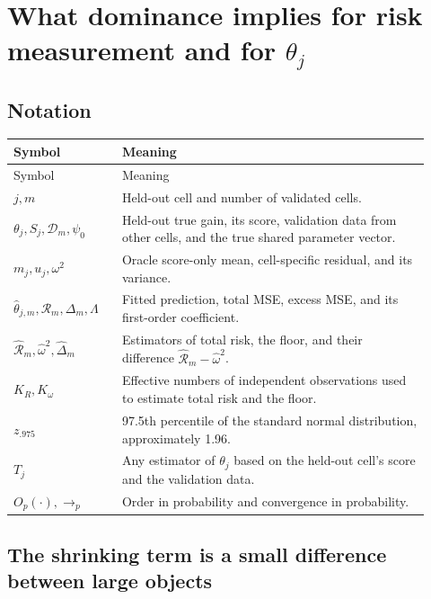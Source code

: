 \documentclass[11pt]{article}
\begin{document}
\section{What dominance implies for risk measurement and for
\texorpdfstring{\(\theta_j\)}{theta j}}

\subsection*{Notation}

\begin{longtable}{>{\raggedright\arraybackslash}p{0.24\linewidth}
                  >{\raggedright\arraybackslash}p{0.68\linewidth}}
\hline
Symbol & Meaning \\
\hline
\endfirsthead
\hline
Symbol & Meaning \\
\hline
\endhead
\(j,m\) & Held-out cell and number of validated cells. \\
\(\theta_j,S_j,\mathcal D_m,\psi_0\) & Held-out true gain, its score,
validation data from other cells, and the true shared parameter vector. \\
\(m_j,u_j,\omega^2\) & Oracle score-only mean, cell-specific residual, and
its variance. \\
\(\widehat\theta_{j,m},\mathcal R_m,\Delta_m,\Lambda\) & Fitted prediction,
total MSE, excess MSE, and its first-order coefficient. \\
\(\widehat{\mathcal R}_m,\widehat\omega^2,
\widehat\Delta_m\) & Estimators of total risk, the floor, and their
difference \(\widehat{\mathcal R}_m-\widehat\omega^2\). \\
\(K_R,K_\omega\) & Effective numbers of independent observations used to
estimate total risk and the floor. \\
\(z_{.975}\) & 97.5th percentile of the standard normal distribution,
approximately 1.96. \\
\(T_j\) & Any estimator of \(\theta_j\) based on the held-out cell's score
and the validation data. \\
\(O_p(\cdot),\longrightarrow_p\) & Order in probability and convergence in
probability. \\
\hline
\end{longtable}

\subsection*{The shrinking term is a small difference between large objects}
\end{document}
